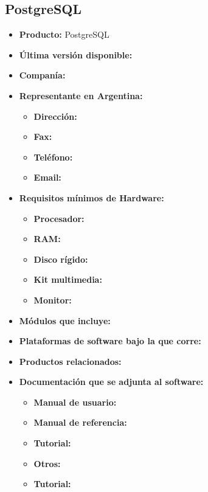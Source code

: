 \subsection{PostgreSQL}

\begin{itemize}
  \item \textbf{Producto:} PostgreSQL
  \item \textbf{Última versión disponible:}
  \item \textbf{Companía:}

  \item \textbf{Representante en Argentina:}
    \begin{itemize}
      \item \textbf{Dirección:}
      \item \textbf{Fax:}
      \item \textbf{Teléfono:}
      \item \textbf{Email:}
    \end{itemize}

  \item \textbf{Requisitos mínimos de Hardware:}
    \begin{itemize}
      \item \textbf{Procesador:}
      \item \textbf{RAM:}
      \item \textbf{Disco rígido:}
      \item \textbf{Kit multimedia:}
      \item \textbf{Monitor:}
    \end{itemize}

    \item \textbf{Módulos que incluye:}
    \item \textbf{Plataformas de software bajo la que corre:}
    \item \textbf{Productos relacionados:}

    \item \textbf{Documentación que se adjunta al software:}
      \begin{itemize}
        \item \textbf{Manual de usuario:}
        \item \textbf{Manual de referencia:}
        \item \textbf{Tutorial:}
        \item \textbf{Otros:}
        \item \textbf{Tutorial:}
      \end{itemize}


\end{itemize}

